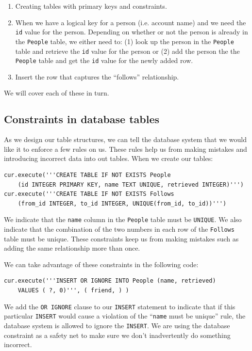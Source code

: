 \documentclass[10pt]{book}
\begin{document}
\begin{enumerate}

\item Creating tables with primary keys and constraints.

\item When we have a logical key for a person (i.e. account
name) and we need the {\tt id} value for the person.
Depending on whether or not the person is already
in the {\tt People} table, we either need to: 
(1) look up the person in the {\tt People} table and 
retrieve the {\tt id} value for the person 
or (2) add the person the the {\tt People} table and get the 
{\tt id} value for the newly added row.

\item Insert the row that captures the ``follows'' relationship.

\end{enumerate}

We will cover each of these in turn.

\subsection{Constraints in database tables}

As we design our table structures, we can tell the database system 
that we would like it to enforce a few rules on us.   These rules
help us from making mistakes and introducing incorrect data into 
out tables.   When we create our tables:

\beforeverb
\begin{verbatim}
cur.execute('''CREATE TABLE IF NOT EXISTS People 
    (id INTEGER PRIMARY KEY, name TEXT UNIQUE, retrieved INTEGER)''')
cur.execute('''CREATE TABLE IF NOT EXISTS Follows 
    (from_id INTEGER, to_id INTEGER, UNIQUE(from_id, to_id))''')
\end{verbatim}
\afterverb
%
We indicate that the {\tt name} column in the {\tt People} table must be
{\tt UNIQUE}.   We also indicate that the combination of the two numbers
in each row of the {\tt Follows} table must be unique.  These constraints
keep us from making mistakes such as adding the same relationship more than
once.

We can take advantage of these constraints in the following code:

\beforeverb
\begin{verbatim}
cur.execute('''INSERT OR IGNORE INTO People (name, retrieved) 
    VALUES ( ?, 0)''', ( friend, ) )
\end{verbatim}
\afterverb
%
We add the {\tt OR IGNORE} clause to our {\tt INSERT} statement to indicate
that if this particular {\tt INSERT} would cause a violation of the
``{\tt name} must be unique'' rule, the database system is allowed to ignore the 
{\tt INSERT}.  We are using the database constraint as a safety net
to make sure we don't inadvertently do something incorrect.
\end{document}

